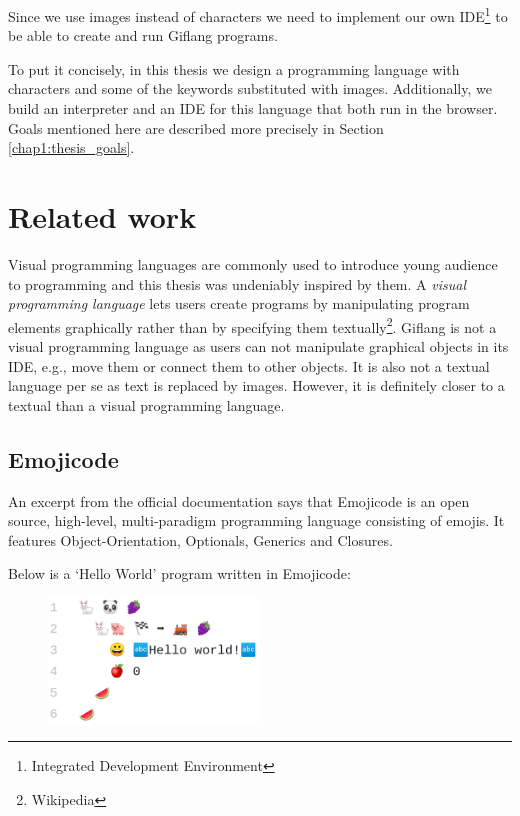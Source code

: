 Since we use images instead of characters we need to implement our own IDE\footnote{Integrated Development Environment} to be able to
create and run Giflang programs.

To put it concisely, in this thesis we design a programming language with characters and some of the keywords substituted with images.
Additionally, we build an interpreter and an IDE for this language that both run in the browser. Goals mentioned here are described
more precisely in Section \ref{chap1:thesis_goals}. 

\section{Related work}
\label{chap1:related_work}
Visual programming languages are commonly used to introduce young audience to programming and this thesis was undeniably inspired by them.
A \emph{visual programming language} lets users create programs by manipulating program elements graphically rather than by specifying them
textually\footnote{Wikipedia}. Giflang is not a visual programming language as users can not manipulate graphical objects in its IDE, e.g.,
move them or connect them to other objects. It is also not a textual language per se as text is replaced by images. However, it is definitely closer
to a textual than a visual programming language.

\subsection{Emojicode}
An excerpt from the official documentation says that Emojicode \cite{Emojicode} is an open source, high-level, multi-paradigm programming language consisting of emojis.
It features Object-Orientation, Optionals, Generics and Closures.

Below is a `Hello World' program written in Emojicode:
\begin{figure}[!hbt]
	\includegraphics[width=0.5\textwidth]{../img/emojicode_helloworld}
	\label{fig:chap1:emojicode_helloworld}
\end{figure}

